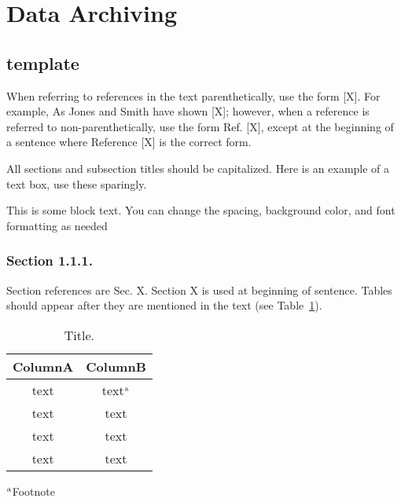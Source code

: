 \section{Data Archiving} \label{sec:data-archiving}
\subsection{template}
\label{level2:headingscap}
\normalsize When referring to references in the text parenthetically, use the form [X]. For example, As Jones and Smith have shown [X]; however, when a reference is referred to non-parenthetically, use the form Ref. [X], except at the beginning of a sentence where Reference [X] is the correct form.\cite{Caxton,Eston1993,Farindon,FIPS1402,giancoli2008physics,Isley,Joslin,Maloney2016,Marcheford,MSU-CSE-06-2,Prives2016,Roberts1982,SP80053r4,wilkinson_1990,Xiong2015} 


All sections and subsection titles should be capitalized. Here is an example of a text box, use these sparingly.
\begin{tcolorbox}
This is some block text. You can change the spacing, background color, and font formatting as needed
\end{tcolorbox}
\subsubsection{Section 1.1.1.}
\label{level3:headingscap}
Section references are Sec. X. Section X is used at beginning of sentence.
Tables should appear after they are mentioned in the text (see Table~\ref{tab:example}).
\begin{table}[h]
	\centering
	\caption{Title.}
	\label{tab:example}
	\small
	\begin{tabular}{cc}
		\hline
		ColumnA & ColumnB \\ \hline
		text & text{\scriptsize $^{\rm a}$} \\
		text & text \\
		text & text \\
		text & text \\
		\hline
	\end{tabular}
	
	{\footnotesize 	{\scriptsize $^{\rm a}$}Footnote}
\end{table}
